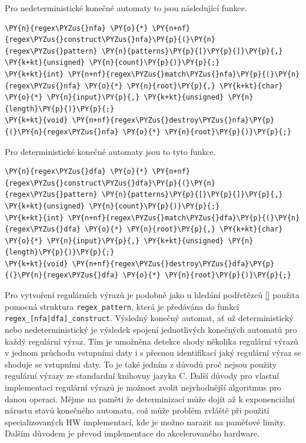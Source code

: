 Pro nedeterministické konečné automaty to jsou následující funkce.

\begin{Verbatim}[commandchars=\\\{\}]
\PY{n}{regex\PYZus{}nfa} \PY{o}{*} \PY{n+nf}{regex\PYZus{}construct\PYZus{}nfa}\PY{p}{(}\PY{n}{regex\PYZus{}pattern} \PY{n}{patterns}\PY{p}{[}\PY{p}{]}\PY{p}{,} \PY{k+kt}{unsigned} \PY{n}{count}\PY{p}{)}\PY{p}{;}
\PY{k+kt}{int} \PY{n+nf}{regex\PYZus{}match\PYZus{}nfa}\PY{p}{(}\PY{n}{regex\PYZus{}nfa} \PY{o}{*} \PY{n}{root}\PY{p}{,} \PY{k+kt}{char} \PY{o}{*} \PY{n}{input}\PY{p}{,} \PY{k+kt}{unsigned} \PY{n}{length}\PY{p}{)}\PY{p}{;}
\PY{k+kt}{void} \PY{n+nf}{regex\PYZus{}destroy\PYZus{}nfa}\PY{p}{(}\PY{n}{regex\PYZus{}nfa} \PY{o}{*} \PY{n}{root}\PY{p}{)}\PY{p}{;}
\end{Verbatim}

Pro deterministické konečné automaty jsou to tyto funkce.
\begin{Verbatim}[commandchars=\\\{\}]
\PY{n}{regex\PYZus{}dfa} \PY{o}{*} \PY{n+nf}{regex\PYZus{}construct\PYZus{}dfa}\PY{p}{(}\PY{n}{regex\PYZus{}pattern} \PY{n}{patterns}\PY{p}{[}\PY{p}{]}\PY{p}{,} \PY{k+kt}{unsigned} \PY{n}{count}\PY{p}{)}\PY{p}{;}
\PY{k+kt}{int} \PY{n+nf}{regex\PYZus{}match\PYZus{}dfa}\PY{p}{(}\PY{n}{regex\PYZus{}dfa} \PY{o}{*} \PY{n}{root}\PY{p}{,} \PY{k+kt}{char} \PY{o}{*} \PY{n}{input}\PY{p}{,} \PY{k+kt}{unsigned} \PY{n}{length}\PY{p}{)}\PY{p}{;}
\PY{k+kt}{void} \PY{n+nf}{regex\PYZus{}destroy\PYZus{}dfa}\PY{p}{(}\PY{n}{regex\PYZus{}dfa} \PY{o}{*} \PY{n}{root}\PY{p}{)}\PY{p}{;}
\end{Verbatim}

Pro vytvoření regulárních výrazů je podobně jako u hledání podřetězců \ref{}
použita pomocná struktura \texttt{regex\_pattern}, která je předávána do funkcí \texttt{regex\_[nfa|dfa]\_construct}.
Výsledný konečný automat, ať už deterministický nebo nedeterministický je výsledek spojení jednotlivých
konečných automatů pro každý regulární výraz. Tím je umožněna detekce shody několika
regulární výrazů v jednom průchodu vstupními daty i s přesnou identifikací jaký regulární
výraz se shoduje se vstupními daty. To je také jedním z důvodů proč nejsou použity regulární výrazy ze standardní
knihovny jazyka C.
Další důvody pro vlastní implementaci regulární výrazů je možnost zvolit nejvhodnější algoritmus pro danou operaci.
Mějme na paměti že determinizací může dojít až k exponenciální nárustu stavů konečného automatu, což může problém
zvláště při použití specializovaných HW implementací, kde je možno narazit na paměťové limity.
Dalším důvodem je převod implementace do akcelerovaného hardware.


